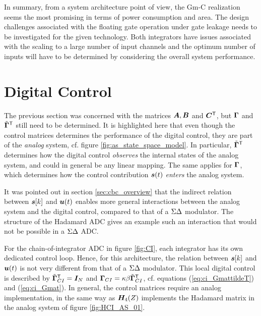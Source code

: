 In summary, from a system architecture point of view, the Gm-C realization seems the most promising in terms of power consumption and area. The design challenges associated with the floating gate operation under gate leakage needs to be investigated for the given technology. Both integrators have issues associated with the scaling to a large number of input channels and the optimum number of inputs will have to be determined by considering the overall system performance.

















\section{Digital Control}
The previous section was concerned with the matrices $\bm{A}, \bm{B}$ and $\bm{C}^\mathsf{T}$, but $\bm{\Gamma}$ and $\tilde{\bm{\Gamma}}^\mathsf{T}$ still need to be determined. It is highlighted here that even though the control matrices determines the performance of the digital control, they are part of the \textit{analog} system, cf. figure \ref{fig:as_state_space_model}. In particular, $\tilde{\bm{\Gamma}}^\mathsf{T}$ determines how the digital control \textit{observes} the internal states of the analog system, and could in general be any linear mapping. The same applies for $\bm{\Gamma}$, which determines how the control contribution $\bm{s}(t)$ \textit{enters} the analog system.

It was pointed out in section \ref{sec:cbc_overview} that the indirect relation between $\bm{s}[k]$ and $\bm{u}(t)$ enables more general interactions between the analog system and the digital control, compared to that of a $\Sigma\Delta$ modulator. The structure of the Hadamard ADC gives an example such an interaction that would not be possible in a $\Sigma\Delta$ ADC.

For the chain-of-integrator ADC in figure \ref{fig:CI}, each integrator has its own dedicated control loop. Hence, for this architecture, the relation between $\bm{s}[k]$ and $\bm{u}(t)$ is not very different from that of a $\Sigma\Delta$ modulator. This local digital control is described by $\tilde{\bm{\Gamma}}^\mathsf{T}_{CI} = \bm{I}_{N}$ and $\bm{\Gamma}_{CI} = \kappa \beta \tilde{\bm{\Gamma}}^\mathsf{T}_{CI}$, cf. equations (\ref{eq:ci_GmattildeT}) and (\ref{eq:ci_Gmat}). In general, the control matrices require an analog implementation, in the same way as $\bm{H_}{4}(Z)$ implements the Hadamard matrix in the analog system of figure \ref{fig:HCI_AS_01}.



